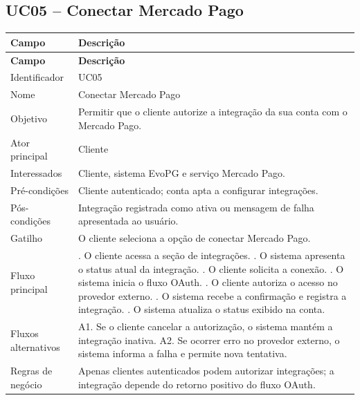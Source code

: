 \documentclass[
  12pt,
  openany,
  oneside,
  a4paper,
  brazil
]{abntex2}
\begin{document}
\subsection{UC05 -- Conectar Mercado Pago}
\begin{longtable}{>{\raggedright\arraybackslash}p{3.3cm} >{\raggedright\arraybackslash}p{10cm}}
\toprule
\textbf{Campo} & \textbf{Descri\c{c}\~ao} \\
\midrule
\endfirsthead
\toprule
\textbf{Campo} & \textbf{Descri\c{c}\~ao} \\
\midrule
\endhead
Identificador & UC05 \\
Nome & Conectar Mercado Pago \\
Objetivo & Permitir que o cliente autorize a integra\c{c}\~ao da sua conta com o Mercado Pago. \\
Ator principal & Cliente \\
Interessados & Cliente, sistema EvoPG e servi\c{c}o Mercado Pago. \\
Pr\'e-condi\c{c}\~oes & Cliente autenticado; conta apta a configurar integra\c{c}\~oes. \\
P\'os-condi\c{c}\~oes & Integra\c{c}\~ao registrada como ativa ou mensagem de falha apresentada ao usu\'ario. \\
Gatilho & O cliente seleciona a op\c{c}\~ao de conectar Mercado Pago. \\
Fluxo principal & 1. O cliente acessa a se\c{c}\~ao de integra\c{c}\~oes. \newline 2. O sistema apresenta o status atual da integra\c{c}\~ao. \newline 3. O cliente solicita a conex\~ao. \newline 4. O sistema inicia o fluxo OAuth. \newline 5. O cliente autoriza o acesso no provedor externo. \newline 6. O sistema recebe a confirma\c{c}\~ao e registra a integra\c{c}\~ao. \newline 7. O sistema atualiza o status exibido na conta. \\
Fluxos alternativos & A1. Se o cliente cancelar a autoriza\c{c}\~ao, o sistema mant\'em a integra\c{c}\~ao inativa. \newline A2. Se ocorrer erro no provedor externo, o sistema informa a falha e permite nova tentativa. \\
Regras de neg\'ocio & Apenas clientes autenticados podem autorizar integra\c{c}\~oes; a integra\c{c}\~ao depende do retorno positivo do fluxo OAuth. \\
\bottomrule
\end{longtable}
\end{document}
